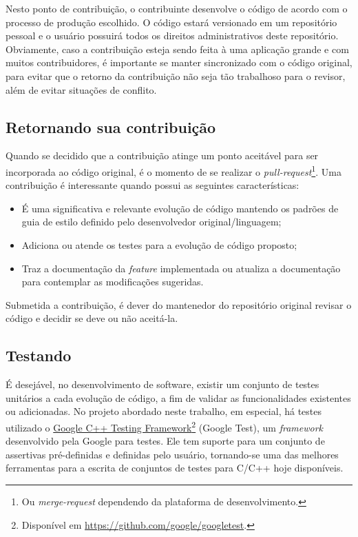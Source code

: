 Nesto ponto de contribuição, o contribuinte desenvolve o código de acordo com o processo de produção escolhido. O código estará versionado em um repositório pessoal e o usuário possuirá todos os direitos administrativos deste repositório. Obviamente, caso a contribuição esteja sendo feita à uma aplicação grande e com muitos contribuidores, é importante se manter sincronizado com o código original, para evitar que o retorno da contribuição não seja tão trabalhoso para o revisor, além de evitar situações de conflito.

\subsection*{Retornando sua contribuição} %
\label{sub:retornando_sua_contribui_o}

Quando se decidido que a contribuição atinge um ponto aceitável para ser incorporada ao código original, é o momento de se realizar o \textit{pull-request}\footnote{Ou \textit{merge-request} dependendo da plataforma de desenvolvimento.}. Uma contribuição é interessante quando possui as seguintes características:


\begin{itemize}
	\item É uma significativa e relevante evolução de código mantendo os padrões de guia de estilo definido pelo desenvolvedor original/linguagem;
	\item Adiciona ou atende os testes para a evolução de código proposto;
	\item Traz a documentação da \textit{feature} implementada ou atualiza a documentação para contemplar as modificações sugeridas.
\end{itemize}

Submetida a contribuição, é dever do mantenedor do repositório original revisar o código e decidir se deve ou não aceitá-la.


\subsection*{Testando} %
\label{sub:testando}

É desejável, no desenvolvimento de software, existir um conjunto de testes unitários a cada evolução de código, a fim de validar as funcionalidades existentes ou adicionadas. No projeto abordado neste trabalho, em especial, há testes utilizado o \href{https://github.com/google/googletest}{Google C++ Testing Framework}\footnote{Disponível em \url{https://github.com/google/googletest}.} (Google Test), um \textit{framework} desenvolvido pela Google para testes. Ele tem suporte para um conjunto de assertivas pré-definidas e definidas pelo usuário, tornando-se uma das melhores ferramentas para a escrita de conjuntos de testes para C/C++ hoje disponíveis.

